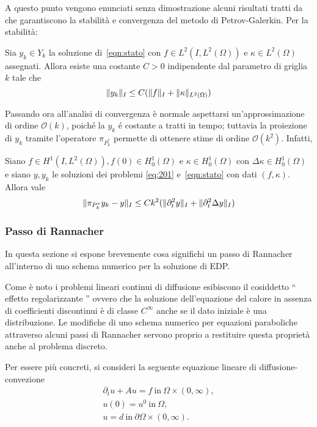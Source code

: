 A questo punto vengono enunciati senza dimostrazione alcuni risultati tratti da \cite{MAIN} che garantiscono la stabilità e convergenza del metodo di Petrov-Galerkin. Per la stabilità:
 \begin{lemma} 
 \label{stab:stato}
 Sia $y_k\in Y_k$ la soluzione di~\eqref{eqn:stato} con $f\in L^2(I,L^2(\Omega))$ e $\kappa\in L^2(\Omega)$ assegnati. Allora esiste una costante $C>0$ indipendente dal parametro di griglia $k$ tale che
 \[
 \lVert y_k\rVert_I\le C(\lVert f\rVert_I + \lVert\kappa\rVert_{L^2(\Omega)})
 \]
\end{lemma}
 Passando ora all'analisi di convergenza è normale aspettarsi un'approssimazione di ordine $\mathcal{O}(k)$, poiché la $y_k$ é costante a tratti in tempo; tuttavia la proiezione di $y_k$ tramite l'operatore $\pi_{P^*_k}$ permette di ottenere stime di ordine $\mathcal{O}(k^2)$. Infatti,
 \begin{lemma} 
 \label{conv:stato}
 Siano $f\in H^1(I,L^2(\Omega)),f(0)\in H^1_0(\Omega)$ e $\kappa\in H^1_0(\Omega)$ con $\Delta\kappa\in H^1_0(\Omega)$ e siano $y,y_k$ le soluzioni dei problemi \ref{eq:201} e~\eqref{eqn:stato} con dati $(f,\kappa)$. Allora vale
 \[
 \lVert\pi_{P^*_k}y_k-y\rVert_I\le Ck^2(\lVert\partial^2_t y\rVert_I + \lVert\partial^2_t \Delta y\rVert_I)
 \]
 \end{lemma}
 
\subsubsection{Passo di Rannacher}
In questa sezione si espone brevemente cosa significhi un passo di Rannacher all'interno di uno schema numerico per la soluzione di EDP.

Come è noto i problemi lineari continui di diffusione esibiscono il cosiddetto `` effetto regolarizzante '' ovvero che la soluzione dell'equazione del calore in assenza di coefficienti discontinui è di classe $ C^{\infty} $ anche se il dato iniziale è una distribuzione. Le modifiche di uno schema numerico per equazioni paraboliche attraverso alcuni passi di Rannacher servono proprio a restituire questa proprietà anche al problema discreto.

Per essere più concreti, si consideri la seguente equazione lineare di diffusione-convezione
\begin{gather}
\label{heat}
\partial_t u + Au=f \ \text{in}\ \Omega\times(0,\infty),  \\
u(0)=u^0 \ \text{in}\ \Omega, \\
u=d \ \text{in} \ \partial\Omega\times (0,\infty).
\end{gather}

